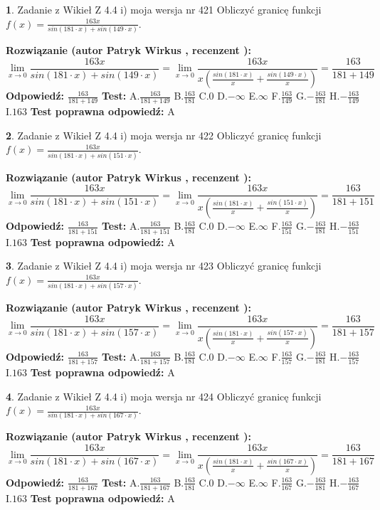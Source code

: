 \documentclass[12pt, a4paper]{article}
\theoremstyle{definition} %
\newtheorem{zad}{}
\newcommand{\zadStart}[1]{\begin{zad}#1\newline}
\newcommand{\zadStop}{\end{zad}}
\newcommand{\rozwStart}[2]{\noindent \textbf{Rozwiązanie (autor #1 , recenzent #2): }\newline}
\newcommand{\rozwStop}{\newline}
\newcommand{\odpStart}{\noindent \textbf{Odpowiedź:}\newline}
\newcommand{\odpStop}{\newline}
\newcommand{\testStart}{\noindent \textbf{Test:}\newline}
\newcommand{\testStop}{\newline}
\newcommand{\kluczStart}{\noindent \textbf{Test poprawna odpowiedź:}\newline}
\newcommand{\kluczStop}{\newline}
\begin{document}
\zadStart{Zadanie z Wikieł Z 4.4 i) moja wersja nr 421}
Obliczyć granicę funkcji $f(x)=\frac{163x}{sin(181\cdot x) +sin(149\cdot x)}$.
\zadStop
\rozwStart{Patryk Wirkus}{}
$$\lim\limits_{x\to 0}\frac{163x}{sin(181\cdot x) +sin(149\cdot x)}=\lim\limits_{x\to 0}\frac{163x}{x(\frac{sin(181\cdot x)}{x}+\frac{sin(149\cdot x)}{x})}=\frac{163}{181+149}$$
\rozwStop
\odpStart
$\frac{163}{181+149}$
\odpStop
\testStart
A.$\frac{163}{181+149}$
B.$\frac{163}{181}$
C.$0$
D.$-\infty$
E.$\infty$
F.$\frac{163}{149}$
G.$-\frac{163}{181}$
H.$-\frac{163}{149}$
I.$163$
\testStop
\kluczStart
A
\kluczStop



\zadStart{Zadanie z Wikieł Z 4.4 i) moja wersja nr 422}
Obliczyć granicę funkcji $f(x)=\frac{163x}{sin(181\cdot x) +sin(151\cdot x)}$.
\zadStop
\rozwStart{Patryk Wirkus}{}
$$\lim\limits_{x\to 0}\frac{163x}{sin(181\cdot x) +sin(151\cdot x)}=\lim\limits_{x\to 0}\frac{163x}{x(\frac{sin(181\cdot x)}{x}+\frac{sin(151\cdot x)}{x})}=\frac{163}{181+151}$$
\rozwStop
\odpStart
$\frac{163}{181+151}$
\odpStop
\testStart
A.$\frac{163}{181+151}$
B.$\frac{163}{181}$
C.$0$
D.$-\infty$
E.$\infty$
F.$\frac{163}{151}$
G.$-\frac{163}{181}$
H.$-\frac{163}{151}$
I.$163$
\testStop
\kluczStart
A
\kluczStop



\zadStart{Zadanie z Wikieł Z 4.4 i) moja wersja nr 423}
Obliczyć granicę funkcji $f(x)=\frac{163x}{sin(181\cdot x) +sin(157\cdot x)}$.
\zadStop
\rozwStart{Patryk Wirkus}{}
$$\lim\limits_{x\to 0}\frac{163x}{sin(181\cdot x) +sin(157\cdot x)}=\lim\limits_{x\to 0}\frac{163x}{x(\frac{sin(181\cdot x)}{x}+\frac{sin(157\cdot x)}{x})}=\frac{163}{181+157}$$
\rozwStop
\odpStart
$\frac{163}{181+157}$
\odpStop
\testStart
A.$\frac{163}{181+157}$
B.$\frac{163}{181}$
C.$0$
D.$-\infty$
E.$\infty$
F.$\frac{163}{157}$
G.$-\frac{163}{181}$
H.$-\frac{163}{157}$
I.$163$
\testStop
\kluczStart
A
\kluczStop



\zadStart{Zadanie z Wikieł Z 4.4 i) moja wersja nr 424}
Obliczyć granicę funkcji $f(x)=\frac{163x}{sin(181\cdot x) +sin(167\cdot x)}$.
\zadStop
\rozwStart{Patryk Wirkus}{}
$$\lim\limits_{x\to 0}\frac{163x}{sin(181\cdot x) +sin(167\cdot x)}=\lim\limits_{x\to 0}\frac{163x}{x(\frac{sin(181\cdot x)}{x}+\frac{sin(167\cdot x)}{x})}=\frac{163}{181+167}$$
\rozwStop
\odpStart
$\frac{163}{181+167}$
\odpStop
\testStart
A.$\frac{163}{181+167}$
B.$\frac{163}{181}$
C.$0$
D.$-\infty$
E.$\infty$
F.$\frac{163}{167}$
G.$-\frac{163}{181}$
H.$-\frac{163}{167}$
I.$163$
\testStop
\kluczStart
A
\kluczStop
\end{document}
